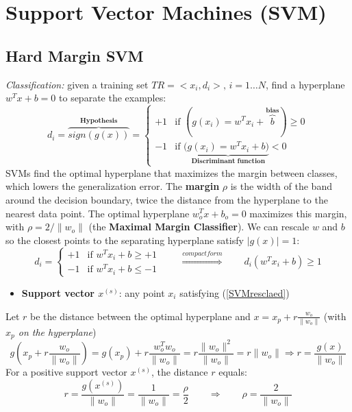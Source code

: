\section{Support Vector Machines (SVM)}
\subsection{Hard Margin SVM}
\textit{Classification:} given a training set $TR = <x_i,d_i>, \, i=1 \dots N$, find a hyperplane $w^T x + b = 0$ to separate the examples:
\begin{equation}
d_i = \overbrace{sign(g(x))}^{\textbf{Hypothesis}}=
\begin{cases}
+1 & \text{if }    (g(x_i) = w^T x_i + \overbrace{b}^\textbf{bias} )\geq 0 \\
-1 & \text{if }    (\underbrace{g(x_i) = w^T x_i + b )}_{\textbf{Discriminant function}}< 0
\end{cases}
\end{equation}
SVMs find the optimal hyperplane that maximizes the margin between classes, which lowers the generalization error. The \textbf{margin} $\rho$ is the width of the band around the decision boundary, twice the distance from the hyperplane to the nearest data point. The optimal hyperplane $w_o^Tx + b_o = 0$ maximizes this margin, with $\rho = 2 / \|w_o\|$ (the \textbf{Maximal Margin Classifier}). We can rescale $w$ and $b$ so the closest points to the separating hyperplane satisfy $|g(x)| = 1$:
\begin{equation}\label{SVMresclaed}
d_i = \begin{cases}
    +1 & \text{if }w^T x_i + b \geq +1 \\
    -1 & \text{if }w^T x_i + b \leq -1 
\end{cases}    \qquad \overset{compact form}{\Longrightarrow}\qquad     d_i(w^T x_i + b) \geq 1
\end{equation}
\begin{itemize}
    \item \textbf{Support vector $x^{(s)}$}: any point $x_i$ satisfying (\ref{SVMresclaed})
\end{itemize}
Let $r$ be the distance between the optimal hyperplane and $x = x_p + r\frac{w_o}{\|w_o\|}$ (with \textit{$x_p$ on the hyperplane})
\begin{equation}
    g\left(x_p + r\dfrac{w_o}{\|w_o\|}\right) = g(x_p) + r \dfrac{w_o^T w_o}{\|w_o\|} = r \dfrac{\|w_o\|^2}{\|w_o\|} = r \|w_o\| \Rightarrow r = \dfrac{g(x)}{\|w_o\|}
\end{equation}
For a positive support vector $x^{(s)}$, the distance $r$ equals:
\begin{equation}
    r = \dfrac{g(x^{(s)})}{\|w_o\|} = \dfrac{1}{\|w_o\|} = \dfrac{\rho}{2} \qquad \Longrightarrow \qquad \rho = \dfrac{2}{\|w_o\|}
\end{equation}

